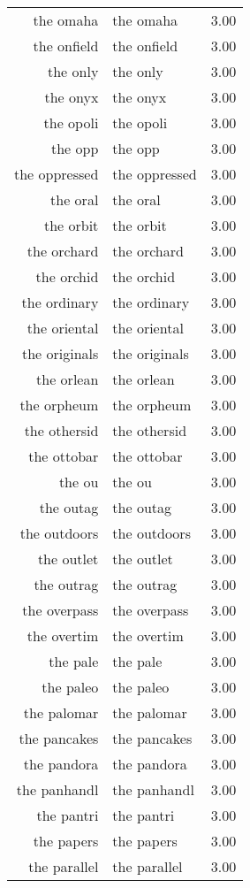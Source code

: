 \begin{table}[ht]
\begin{tabular}{rlr}
  the omaha & the omaha & 3.00 \\ 
  the onfield & the onfield & 3.00 \\ 
  the only & the only & 3.00 \\ 
  the onyx & the onyx & 3.00 \\ 
  the opoli & the opoli & 3.00 \\ 
  the opp & the opp & 3.00 \\ 
  the oppressed & the oppressed & 3.00 \\ 
  the oral & the oral & 3.00 \\ 
  the orbit & the orbit & 3.00 \\ 
  the orchard & the orchard & 3.00 \\ 
  the orchid & the orchid & 3.00 \\ 
  the ordinary & the ordinary & 3.00 \\ 
  the oriental & the oriental & 3.00 \\ 
  the originals & the originals & 3.00 \\ 
  the orlean & the orlean & 3.00 \\ 
  the orpheum & the orpheum & 3.00 \\ 
  the othersid & the othersid & 3.00 \\ 
  the ottobar & the ottobar & 3.00 \\ 
  the ou & the ou & 3.00 \\ 
  the outag & the outag & 3.00 \\ 
  the outdoors & the outdoors & 3.00 \\ 
  the outlet & the outlet & 3.00 \\ 
  the outrag & the outrag & 3.00 \\ 
  the overpass & the overpass & 3.00 \\ 
  the overtim & the overtim & 3.00 \\ 
  the pale & the pale & 3.00 \\ 
  the paleo & the paleo & 3.00 \\ 
  the palomar & the palomar & 3.00 \\ 
  the pancakes & the pancakes & 3.00 \\ 
  the pandora & the pandora & 3.00 \\ 
  the panhandl & the panhandl & 3.00 \\ 
  the pantri & the pantri & 3.00 \\ 
  the papers & the papers & 3.00 \\ 
  the parallel & the parallel & 3.00 \\ 

\end{tabular}
\end{table}
